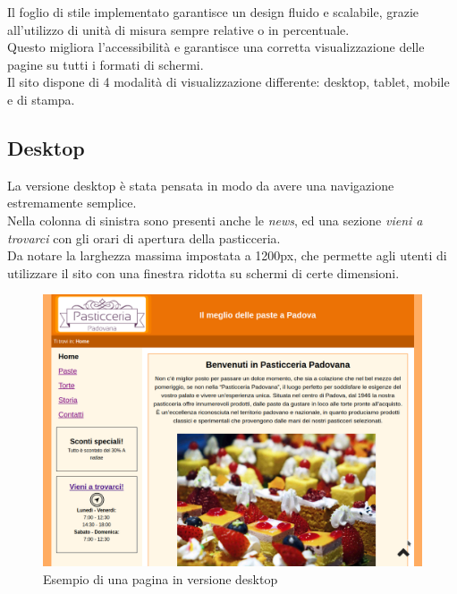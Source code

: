 Il foglio di stile implementato garantisce un design fluido e scalabile, grazie all'utilizzo di unità di misura
sempre relative o in percentuale. \\Questo migliora l'accessibilità e garantisce una corretta visualizzazione delle pagine
su tutti i formati di schermi. \\Il sito dispone di 4 modalità di visualizzazione differente: desktop, tablet, mobile e di stampa.

\subsection{Desktop}
La versione desktop è stata pensata in modo da avere una navigazione estremamente semplice.\\ 
Nella colonna di sinistra sono presenti anche le \emph{news}, ed una sezione \emph{vieni a trovarci} con gli orari di apertura della pasticceria.\\ 
Da notare la larghezza massima impostata a 1200px, che permette agli utenti di utilizzare il sito con una finestra ridotta su schermi di certe dimensioni.

\begin{figure}[!h]
	\centering
	\includegraphics[width=1\linewidth]{sezioni/Progettazione/Immagini/desktop_example.png}
	\caption{Esempio di una pagina in versione desktop}
	\label{Fig:verDesktop}
\end{figure}
\newpage
